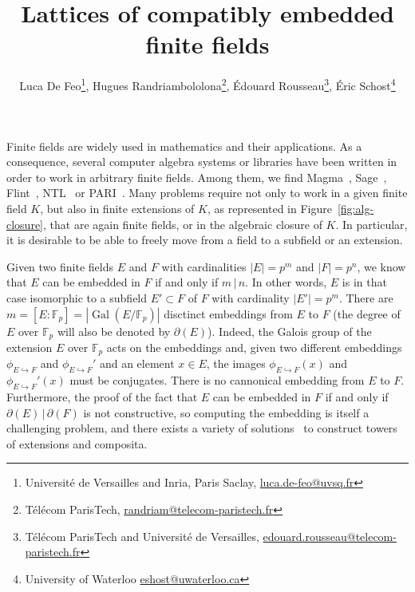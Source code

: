 \documentclass[12pt]{article}
\title{Lattices of compatibly embedded finite fields}
\author{Luca De Feo\footnote{
    Université de Versailles and Inria, Paris Saclay,
    \url{luca.de-feo@uvsq.fr}
  },
  Hugues Randriambololona\footnote{
    Télécom ParisTech,
    \url{randriam@telecom-paristech.fr}
  },
  Édouard Rousseau\footnote{
    Télécom ParisTech and Université de Versailles,
    \url{edouard.rousseau@telecom-paristech.fr}
  },
  Éric Schost\footnote{
    University of Waterloo
    \url{eshost@uwaterloo.ca}
  }
}
\DeclareMathOperator{\Gal}{Gal}
\newcommand{\dE}{\partial(E)}
\newcommand{\dF}{\partial(F)}
\newcommand{\embed}[2]{\phi_{#1\hookrightarrow#2}}
\begin{document}
\maketitle

Finite fields are widely used in mathematics and their applications. As a
consequence, several computer algebra systems or libraries have been written in
order to work in arbitrary finite fields. Among them, we find
Magma~\cite{Magma}, Sage~\cite{Sagemath}, Flint~\cite{Flint}, NTL~\cite{NTL} or
PARI~\cite{Pari}. Many problems require not only to work in a given finite field
$K$, but also in finite extensions of $K$, as represented in
Figure~\ref{fig:alg-closure}, that are again finite fields, or in
the algebraic closure of $K$. In particular, it is desirable to be able to
freely move from a field to a subfield or an extension.

Given two finite fields $E$ and $F$ with cardinalities $|E|=p^{m}$ and
$|F|=p^{n}$, we know that $E$ can be embedded in $F$ if and only if $m\,|\,n$.
In other words, $E$ is in that case isomorphic to a subfield $E'\subset F$ of
$F$ with
cardinality $|E'|=p^{m}$. There are
$m=[E:\mathbb{F}_p]=|\Gal(E/\mathbb{F}_p)|$ disctinct embeddings from $E$ to
$F$ (the degree of $E$ over $\mathbb{F}_p$ will also be denoted by
$\partial(E)$). Indeed, the Galois group of the extension $E$ over
$\mathbb{F}_p$ acts
on the embeddings and, given two different embeddings $\embed{E}{F}$ and
$\embed{E}{F}'$ and an element $x\in E$, the images $\embed{E}{F}(x)$ and
$\embed{E}{F}'(x)$ must be conjugates. There is no cannonical
embedding from $E$ to $F$. Furthermore, the proof of the fact that $E$ can be
embedded in $F$ if and only if $\dE\,|\,\dF$ is not constructive, so computing
the
embedding is itself a challenging problem, and there exists a variety of
solutions~\cite{BDDFS17} to construct towers of extensions and composita.
\end{document}
